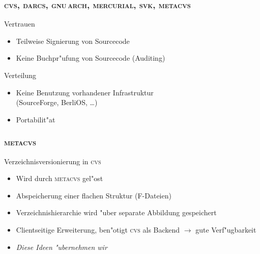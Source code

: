 \documentclass[german]{beamer}
\newcommand{\METACVS}{\textsc{metacvs}}
\newcommand{\CVS}{\textsc{cvs}}
\newcommand{\DARCS}{\textsc{darcs}}
\newcommand{\GNUARCH}{\textsc{gnu\,arch}}
\newcommand{\MERCURIAL}{\textsc{mercurial}}
\newcommand{\SVK}{\textsc{svk}}
\begin{document}
\begin{frame}
  \frametitle{\CVS, \DARCS, \GNUARCH, \MERCURIAL, \SVK, \METACVS}
  \begin{block}{Vertrauen}
    \begin{itemize}
    \item Teilweise Signierung von Sourcecode
    \item \alert{Keine} Buchpr"ufung von Sourcecode (Auditing)
    \end{itemize}
  \end{block}

  \begin{block}{Verteilung}
    \begin{itemize}
    \item \alert{Keine} Benutzung vorhandener Infrastruktur\\
      (SourceForge, BerliOS, \ldots)
    \item Portabilit"at
    \end{itemize}
  \end{block}
  
\end{frame}


\begin{frame}
  \frametitle{\METACVS}
  \begin{block}{Verzeichnisversionierung in \CVS}
    \begin{itemize}
    \item Wird durch \METACVS{} gel"ost
    \item Abspeicherung einer flachen Struktur (F-Dateien)
    \item Verzeichnishierarchie wird "uber separate Abbildung
      gespeichert
    \item Clientseitige Erweiterung, ben"otigt \CVS{} als Backend
      $\to$ gute Verf"ugbarkeit
    \item \emph{Diese Ideen "ubernehmen wir}
    \end{itemize}
  \end{block}
\end{frame}
\end{document}
